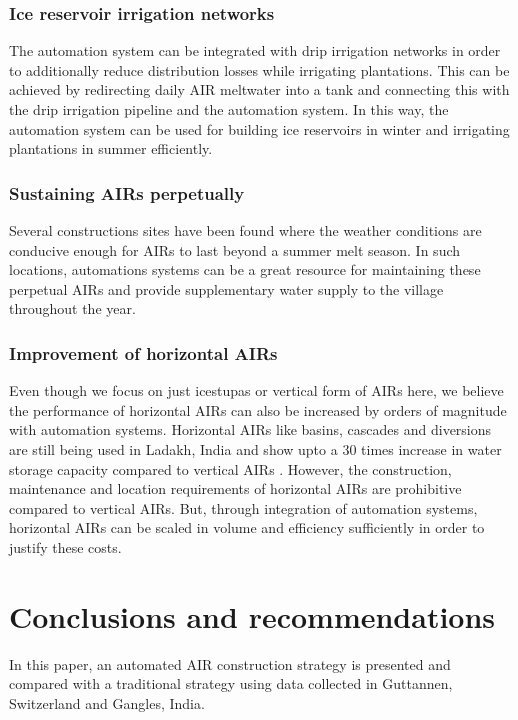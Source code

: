 \documentclass[tc, manuscript]{copernicus}
\begin{document}
\subsubsection{Ice reservoir irrigation networks}

The automation system can be integrated with drip irrigation networks in order to additionally reduce
distribution losses while irrigating plantations. This can be achieved by redirecting daily AIR meltwater into a
tank and connecting this with the drip irrigation pipeline and the automation system. In this way, the
automation system can be used for building ice reservoirs in winter and irrigating plantations in summer
efficiently.

\subsubsection{Sustaining AIRs perpetually}

Several constructions sites have been found where the weather conditions are conducive enough for AIRs to last
beyond a summer melt season. In such locations, automations systems can be a great resource for maintaining
these perpetual AIRs and provide supplementary water supply to the village throughout the year.

\subsubsection{Improvement of horizontal AIRs}

Even though we focus on just icestupas or vertical form of AIRs here, we believe the performance of horizontal
AIRs can also be increased by orders of magnitude with automation systems. Horizontal AIRs like basins, cascades
and diversions are still being used in Ladakh, India and show upto a 30 times increase in water storage capacity
compared to vertical AIRs \citep{nusserSociohydrologyArtificialGlaciers2019}. However, the construction,
maintenance and location requirements of horizontal AIRs are prohibitive compared to vertical AIRs. But, through
integration of automation systems, horizontal AIRs can be scaled in volume and efficiency sufficiently in order
to justify these costs.

\section{Conclusions and recommendations}

In this paper, an automated AIR construction strategy is presented and compared with a traditional strategy
using data collected in Guttannen, Switzerland and Gangles, India.
\end{document}
